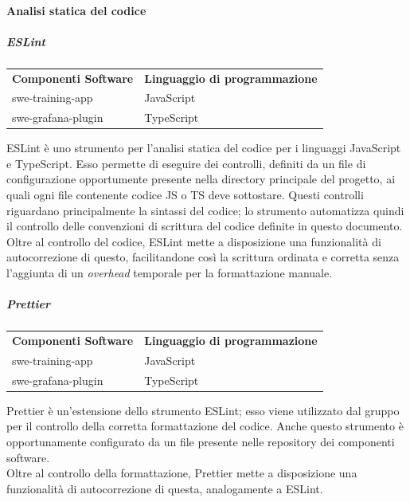 \documentclass[../norme-di-progetto.tex]{subfiles}
\begin{document}
\paragraph{Analisi statica del codice}
\subparagraph{ESLint}
\begin{table}[H]
\centering
\begin{tabular}{P{8cm}P{8cm}}
  \textbf{Componenti Software}  &  \textbf{Linguaggio di programmazione} \\
  swe-training-app  &   JavaScript \\
  swe-grafana-plugin   &   TypeScript \\
\end{tabular}
\end{table}
ESLint è uno strumento per l'analisi statica del codice per i linguaggi JavaScript e TypeScript. Esso permette di eseguire dei controlli, definiti da un file di configurazione opportumente presente nella directory principale del progetto, ai quali ogni file contenente codice JS o TS deve sottostare. Questi controlli riguardano principalmente la sintassi del codice; lo strumento automatizza quindi il controllo delle convenzioni di scrittura del codice definite in questo documento. \\
Oltre al controllo del codice, ESLint mette a disposizione una funzionalità di autocorrezione di questo, facilitandone così la scrittura ordinata e corretta senza l'aggiunta di un \textit{overhead} temporale per la formattazione manuale.

\subparagraph{Prettier}
\begin{table}[H]
\centering
\begin{tabular}{P{8cm}P{8cm}}
  \textbf{Componenti Software}  &  \textbf{Linguaggio di programmazione} \\
  swe-training-app  &   JavaScript \\
  swe-grafana-plugin   &   TypeScript \\
\end{tabular}
\end{table}
Prettier è un'estensione dello strumento ESLint; esso viene utilizzato dal gruppo per il controllo della corretta formattazione del codice. Anche questo strumento è opportunamente configurato da un file presente nelle repository dei componenti software. \\
Oltre al controllo della formattazione, Prettier mette a disposizione una funzionalità di autocorrezione di questa, analogamente a ESLint.
\end{document}
